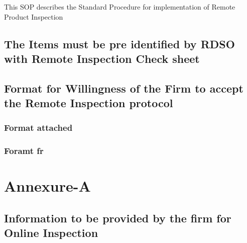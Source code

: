 \documentclass[
]{article}
\begin{document}
This SOP describes the Standard Procedure for implementation of Remote
Product Inspection

\hypertarget{the-items-must-be-pre-identified-by-rdso-with-remote-inspection-check-sheet}{%
\subsection{The Items must be pre identified by RDSO with Remote
Inspection Check
sheet}\label{the-items-must-be-pre-identified-by-rdso-with-remote-inspection-check-sheet}}

\hypertarget{format-for-willingness-of-the-firm-to-accept-the-remote-inspection-protocol}{%
\subsection{Format for Willingness of the Firm to accept the Remote
Inspection
protocol}\label{format-for-willingness-of-the-firm-to-accept-the-remote-inspection-protocol}}

\hypertarget{format-attached}{%
\subsubsection{Format attached}\label{format-attached}}

\hypertarget{foramt-fr}{%
\subsubsection{Foramt fr}\label{foramt-fr}}

\newpage

\hypertarget{annexure-a}{%
\section{Annexure-A}\label{annexure-a}}

\hypertarget{information-to-be-provided-by-the-firm-for-online-inspection}{%
\subsection{Information to be provided by the firm for Online
Inspection}\label{information-to-be-provided-by-the-firm-for-online-inspection}}
\end{document}
